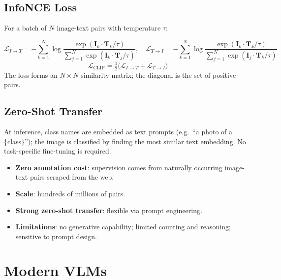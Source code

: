 \documentclass[12pt,a4paper]{report}
\newcommand{\vect}[1]{\mathbf{#1}}
\begin{document}
\subsection{InfoNCE Loss}

For a batch of $N$ image-text pairs with temperature $\tau$:

\begin{formulabox}
\[
    \mathcal{L}_{I\to T}
    = -\sum_{k=1}^{N}\log
      \frac{\exp(\vect{I}_k\!\cdot\vect{T}_k/\tau)}
           {\sum_{j=1}^{N}\exp(\vect{I}_k\!\cdot\vect{T}_j/\tau)},
    \quad
    \mathcal{L}_{T\to I}
    = -\sum_{k=1}^{N}\log
      \frac{\exp(\vect{I}_k\!\cdot\vect{T}_k/\tau)}
           {\sum_{j=1}^{N}\exp(\vect{I}_j\!\cdot\vect{T}_k/\tau)}
\]
\[
    \mathcal{L}_{\text{CLIP}} = \tfrac{1}{2}\bigl(\mathcal{L}_{I\to T}
    + \mathcal{L}_{T\to I}\bigr)
\]
The loss forms an $N\times N$ similarity matrix; the diagonal is the set of
positive pairs.
\end{formulabox}

\subsection{Zero-Shot Transfer}

At inference, class names are embedded as text prompts
(e.g.\ ``a photo of a \{class\}''); the image is classified by finding the
most similar text embedding.  No task-specific fine-tuning is required.

\begin{importantbox}
\begin{itemize}[itemsep=1pt]
    \item \textbf{Zero annotation cost}: supervision comes from naturally
          occurring image-text pairs scraped from the web.
    \item \textbf{Scale}: hundreds of millions of pairs.
    \item \textbf{Strong zero-shot transfer}: flexible via prompt engineering.
    \item \textbf{Limitations}: no generative capability; limited counting
          and reasoning; sensitive to prompt design.
\end{itemize}
\end{importantbox}

\section{Modern VLMs}
\end{document}
